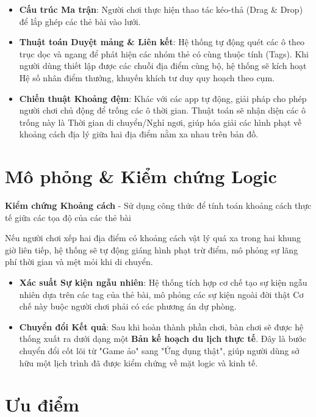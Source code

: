 \begin{itemize}[topsep=0pt, itemsep=2.5pt, leftmargin=1.5cm]
    \item \textbf{Cấu trúc Ma trận}: Người chơi thực hiện thao tác kéo-thả (Drag \& Drop) để lắp ghép các thẻ bài vào lưới.
    \item \textbf{Thuật toán Duyệt mảng \& Liên kết}: Hệ thống tự động quét các ô theo trục dọc và ngang để phát hiện các nhóm thẻ có cùng thuộc tính (Tags). Khi người dùng thiết lập được các chuỗi địa điểm cùng bộ, hệ thống sẽ kích hoạt Hệ số nhân điểm thưởng, khuyến khích tư duy quy hoạch theo cụm.
    \item \textbf{Chiến thuật Khoảng đệm}: Khác với các app tự động, giải pháp cho phép người chơi chủ động để trống các ô thời gian. Thuật toán sẽ nhận diện các ô trống này là Thời gian di chuyển/Nghỉ ngơi, giúp hóa giải các hình phạt về khoảng cách địa lý giữa hai địa điểm nằm xa nhau trên bản đồ.
\end{itemize}

\section{Mô phỏng \& Kiểm chứng Logic}

\textbf{Kiểm chứng Khoảng cách} - Sử dụng công thức để tính toán khoảng cách thực tế giữa các tọa độ của các thẻ bài

Nếu người chơi xếp hai địa điểm có khoảng cách vật lý quá xa trong hai khung giờ liên tiếp, hệ thống sẽ tự động giáng hình phạt trừ điểm, mô phỏng sự lãng phí thời gian và mệt mỏi khi di chuyển.

\begin{itemize}[topsep=0pt, itemsep=2.5pt, leftmargin=1.5cm]
    \item \textbf{Xác suất Sự kiện ngẫu nhiên}: Hệ thống tích hợp cơ chế tạo sự kiện ngẫu nhiên dựa trên các tag của thẻ bài, mô phỏng các sự kiện ngoài đời thật Cơ chế này buộc người chơi phải có các phương án dự phòng.
    \item \textbf{Chuyển đổi Kết quả}: Sau khi hoàn thành phần chơi, bàn chơi sẽ được hệ thống xuất ra dưới dạng một \textbf{Bản kế hoạch du lịch thực tế}. Đây là bước chuyển đổi cốt lõi từ "Game ảo" sang "Ứng dụng thật", giúp người dùng sở hữu một lịch trình đã được kiểm chứng về mặt logic và kinh tế.
\end{itemize}

\section{Ưu điểm}

